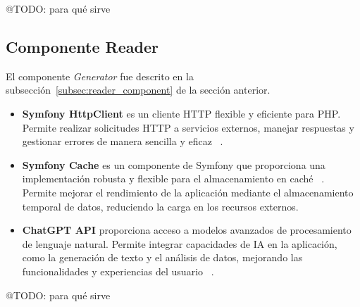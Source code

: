 \colorbox{color_highlight}{@TODO: para qué sirve}

\subsection*{Componente Reader}

El componente \textit{Generator} fue descrito en la subsección~\ref{subsec:reader_component} de la sección anterior.

\begin{itemize}
    \item \textbf{Symfony HttpClient} es un cliente HTTP flexible y eficiente para PHP. Permite realizar solicitudes
    HTTP a servicios externos, manejar respuestas y gestionar errores de manera sencilla y eficaz
    ~\cite{https://symfony.com/doc/current/http_client.html}.
    \item \textbf{Symfony Cache} es un componente de Symfony que proporciona una implementación robusta y flexible
    para el almacenamiento en caché ~\cite{https://symfony.com/doc/current/components/cache.html}.
    Permite mejorar el rendimiento de la aplicación mediante el almacenamiento temporal de datos, reduciendo la carga en
    los recursos externos.
    \item \textbf{ChatGPT API} proporciona acceso a modelos avanzados de procesamiento de lenguaje natural.
    Permite integrar capacidades de IA en la aplicación, como la generación de texto y el análisis de datos, mejorando
    las funcionalidades y experiencias del usuario ~\cite{https://platform.openai.com/docs/api-reference/chat}.
\end{itemize}

\colorbox{color_highlight}{@TODO: para qué sirve}



